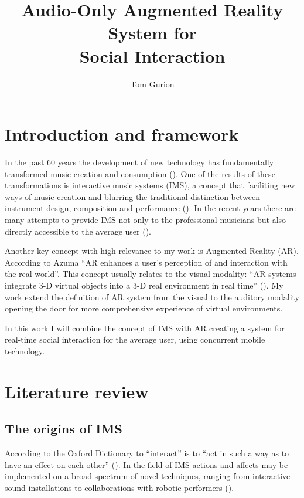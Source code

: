 \documentclass[a4paper,11pt]{article}
\title{Audio-Only Augmented Reality System for\\Social Interaction}
\author{Tom Gurion}
\begin{document}
\maketitle

\section{Introduction and framework}

In the past 60 years the development of new technology has fundamentally transformed music creation and consumption (\cite[]{winkler01}).
One of the results of these transformations is interactive music systems (IMS), a concept that faciliting new ways of music creation and blurring the traditional distinction between instrument design, composition and performance (\cite{drummond09}).
In the recent years there are many attempts to provide IMS not only to the professional musicians but also directly accessible to the average user ().


Another key concept with high relevance to my work is Augmented Reality (AR).
According to Azuma ``AR enhances a user's perception of and interaction with the real world''.
This concept usually relates to the visual modality: ``AR systems integrate 3-D virtual objects into a 3-D real environment in real time'' (\cite{azuma97}).
My work extend the definition of AR system from the visual to the auditory modality opening the door for more comprehensive experience of virtual environments.

In this work I will combine the concept of IMS with AR creating a system for real-time social interaction for the average user, using concurrent mobile technology.

\section{Literature review}

\subsection{The origins of IMS}

According to the Oxford Dictionary to ``interact'' is to ``act in such a way as to have an effect on each other'' (\citeauthor{web:oxford}).
In the field of IMS actions and affects may be implemented on a broad spectrum of novel techniques, ranging from interactive sound installations to collaborations with robotic performers (\cite{drummond09}).
\end{document}
